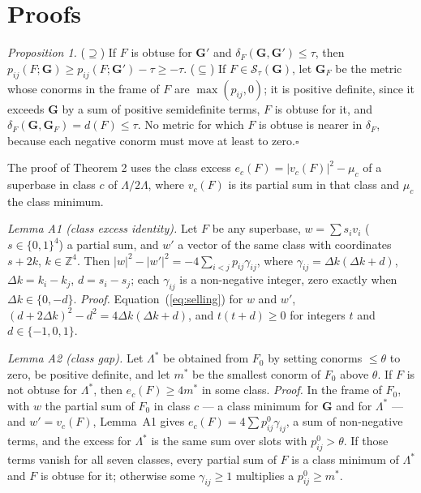 \documentclass[preprint,pdf]{iucr}          %
\newcommand{\Gmet}{\mathbf{G}}
\newcommand{\Sw}{\mathcal{S}_\tau}
\begin{document}
\appendix
\section{Proofs}

\emph{Proposition 1.} ($\supseteq$) If $F$ is obtuse for $\Gmet'$ and $\delta_F(\Gmet,\Gmet')\le\tau$, then $p_{ij}(F;\Gmet)\ge p_{ij}(F;\Gmet')-\tau\ge-\tau$. ($\subseteq$) If $F\in\Sw(\Gmet)$, let $\Gmet_F$ be the metric whose conorms in the frame of $F$ are $\max(p_{ij},0)$; it is positive definite, since it exceeds $\Gmet$ by a sum of positive semidefinite terms, $F$ is obtuse for it, and $\delta_F(\Gmet,\Gmet_F)=d(F)\le\tau$. No metric for which $F$ is obtuse is nearer in $\delta_F$, because each negative conorm must move at least to zero.\hfill$\square$

The proof of Theorem 2 uses the class excess $e_c(F)=|v_c(F)|^2-\mu_c$ of a superbase in class $c$ of $\Lambda/2\Lambda$, where $v_c(F)$ is its partial sum in that class and $\mu_c$ the class minimum.

\emph{Lemma A1 (class excess identity).} Let $F$ be any superbase, $w=\sum s_iv_i$ ($s\in\{0,1\}^4$) a partial sum, and $w'$ a vector of the same class with coordinates $s+2k$, $k\in\mathbb Z^4$. Then $|w|^2-|w'|^2=-4\sum_{i<j}p_{ij}\gamma_{ij}$, where $\gamma_{ij}=\Delta k(\Delta k+d)$, $\Delta k=k_i-k_j$, $d=s_i-s_j$; each $\gamma_{ij}$ is a non-negative integer, zero exactly when $\Delta k\in\{0,-d\}$. \emph{Proof.} Equation~(\ref{eq:selling}) for $w$ and $w'$, $(d+2\Delta k)^2-d^2=4\Delta k(\Delta k+d)$, and $t(t+d)\ge0$ for integers $t$ and $d\in\{-1,0,1\}$.

\emph{Lemma A2 (class gap).} Let $\Lambda^*$ be obtained from $F_0$ by setting conorms $\le\theta$ to zero, be positive definite, and let $m^*$ be the smallest conorm of $F_0$ above $\theta$. If $F$ is not obtuse for $\Lambda^*$, then $e_c(F)\ge4m^*$ in some class. \emph{Proof.} In the frame of $F_0$, with $w$ the partial sum of $F_0$ in class $c$ --- a class minimum for $\Gmet$ and for $\Lambda^*$ --- and $w'=v_c(F)$, Lemma~A1 gives $e_c(F)=4\sum p^0_{ij}\gamma_{ij}$, a sum of non-negative terms, and the excess for $\Lambda^*$ is the same sum over slots with $p^0_{ij}>\theta$. If those terms vanish for all seven classes, every partial sum of $F$ is a class minimum of $\Lambda^*$ and $F$ is obtuse for it; otherwise some $\gamma_{ij}\ge1$ multiplies a $p^0_{ij}\ge m^*$.
\end{document}

